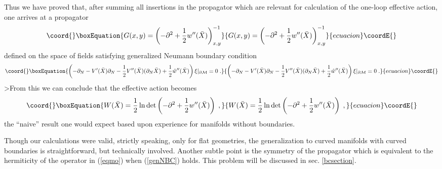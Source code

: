 \documentclass[a4paper,12pt]{article}
\begin{document}
Thus we have proved that,  after summing  all insertions in the
propagator \coordHE{} which are relevant for calculation of the
one-loop effective action,  one arrives at  a propagator 
\begin{equation}\coord{}\boxEquation{
G(x,y)=\left( -\partial^2 +\frac 12 w''(\bar X)\right)^{-1}_{x,y} 
\label{fullprop}
}{
G(x,y)=\left( -\partial^2 +\frac 12 w''(\bar X)\right)^{-1}_{x,y} 
}{ecuacion}\coordE{}\end{equation}
defined on the space of fields satisfying  generalized
Neumann boundary condition
\begin{equation}\coord{}\boxEquation{
\left( -\partial_N -V'(\bar X)\partial_N  -\frac 12 V''(\bar X)
(\partial_N\bar X)
+\frac 12 \hat w''(\bar X) \right) \xi |_{\partial {\cal 
M}}=0\; .
\label{genNBC}
}{
\left( -\partial_N -V'(\bar X)\partial_N  -\frac 12 V''(\bar X)
(\partial_N\bar X)
+\frac 12 \hat w''(\bar X) \right) \xi |_{\partial {\cal 
M}}=0\; .
}{ecuacion}\coordE{}\end{equation}
>From this we can conclude that the effective 
action becomes 
\begin{equation}\coord{}\boxEquation{
W(\bar X)=\frac 12 \ln \det 
\left( -\partial^2 +\frac 12 w''(\bar X)\right) \; ,
\label{ea1504}
}{
W(\bar X)=\frac 12 \ln \det 
\left( -\partial^2 +\frac 12 w''(\bar X)\right) \; ,
}{ecuacion}\coordE{}\end{equation}
the ``naive'' result one would expect based upon  experience
for manifolds without boundaries. 

Though our calculations were valid, strictly speaking, only for
flat geometries, the generalization to curved manifolds with curved
boundaries is straightforward,  but technically involved. Another
subtle point is the symmetry of the propagator \coordHE{} which is
equivalent to the hermiticity of the operator in (\ref{eqmo})
when (\ref{genNBC}) holds. This problem will be discussed in
sec. \ref{bcsection}.
\end{document}
